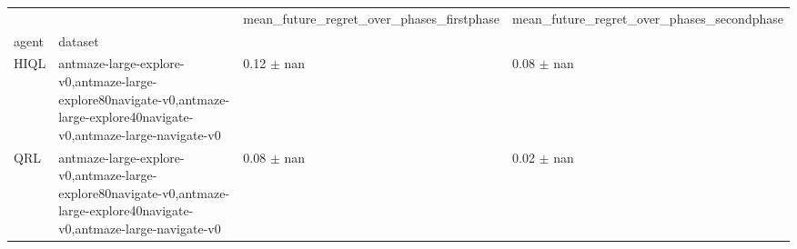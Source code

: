 \begin{tabular}{llll}
\toprule
 &  & mean_future_regret_over_phases_firstphase & mean_future_regret_over_phases_secondphase \\
agent & dataset &  &  \\
\midrule
HIQL & antmaze-large-explore-v0,antmaze-large-explore80navigate-v0,antmaze-large-explore40navigate-v0,antmaze-large-navigate-v0 & 0.12 $\pm$ nan & 0.08 $\pm$ nan \\
\cline{1-4}
QRL & antmaze-large-explore-v0,antmaze-large-explore80navigate-v0,antmaze-large-explore40navigate-v0,antmaze-large-navigate-v0 & 0.08 $\pm$ nan & 0.02 $\pm$ nan \\
\cline{1-4}
\bottomrule
\end{tabular}
